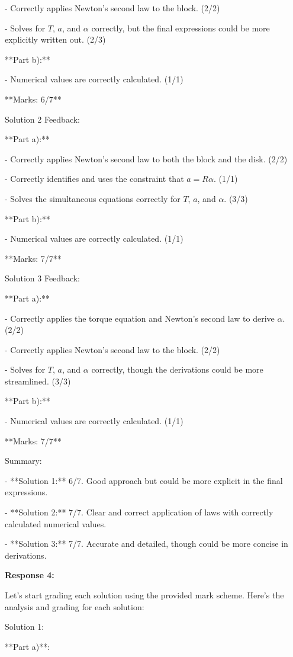 \documentclass[a4paper,11pt]{article}
\begin{document}
- Correctly applies Newton's second law to the block. (2/2)

- Solves for \(T\), \(a\), and \(\alpha\) correctly, but the final expressions could be more explicitly written out. (2/3)

**Part b):**

- Numerical values are correctly calculated. (1/1)

**Marks: 6/7**

Solution 2 Feedback:

**Part a):**

- Correctly applies Newton's second law to both the block and the disk. (2/2)

- Correctly identifies and uses the constraint that \(a = R\alpha\). (1/1)

- Solves the simultaneous equations correctly for \(T\), \(a\), and \(\alpha\). (3/3)

**Part b):**

- Numerical values are correctly calculated. (1/1)

**Marks: 7/7**

Solution 3 Feedback:

**Part a):**

- Correctly applies the torque equation and Newton's second law to derive \(\alpha\). (2/2)

- Correctly applies Newton's second law to the block. (2/2)

- Solves for \(T\), \(a\), and \(\alpha\) correctly, though the derivations could be more streamlined. (3/3)

**Part b):**

- Numerical values are correctly calculated. (1/1)

**Marks: 7/7**

Summary:

- **Solution 1:** 6/7. Good approach but could be more explicit in the final expressions.

- **Solution 2:** 7/7. Clear and correct application of laws with correctly calculated numerical values.

- **Solution 3:** 7/7. Accurate and detailed, though could be more concise in derivations.

\bigskip
\textbf{Response 4:}

Let's start grading each solution using the provided mark scheme. Here's the analysis and grading for each solution:

Solution 1:

**Part a)**:
\end{document}
